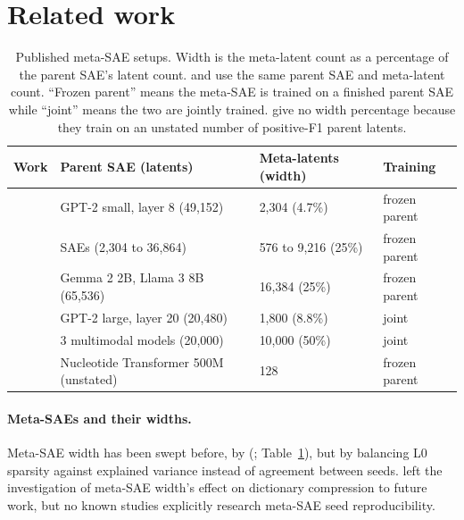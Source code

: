 \section{Related work}

\begin{table}[t]
  \caption{Published meta-SAE setups. Width is the meta-latent count as a percentage of the parent SAE's latent count. \citet{leask2025canonical} and \citet{bussmann2024metasae} use the same parent SAE and meta-latent count. ``Frozen parent'' means the meta-SAE is trained on a finished parent SAE while ``joint'' means the two are jointly trained. \citet{maiwald2025decodeglm} give no width percentage because they train on an unstated number of positive-F1 parent latents.}
  \label{tab:published}
  \centering\small
  \begin{tabular}{@{}llll@{}}
    \toprule
    Work & Parent SAE (latents) & Meta-latents (width) & Training \\
    \midrule
    \citet{bussmann2024metasae} & GPT-2 small, layer 8 (49,152) & 2,304 (4.7\%) & frozen parent \\
    \citet{bussmann2025matryoshka} & SAEs (2,304 to 36,864) & 576 to 9,216 (25\%) & frozen parent \\
    \citet{korznikov2025ortsae} & Gemma 2 2B, Llama 3 8B (65,536) & 16,384 (25\%) & frozen parent \\
    \citet{levinson2026metasaes} & GPT-2 large, layer 20 (20,480) & 1,800 (8.8\%) & joint \\
    \citet{zhao2026saepp} & 3 multimodal models (20,000) & 10,000 (50\%) & joint \\
    \citet{maiwald2025decodeglm} & Nucleotide Transformer 500M (unstated) & 128 & frozen parent \\
    \bottomrule
  \end{tabular}
\end{table}

\paragraph{Meta-SAEs and their widths.}
Meta-SAE width has been swept before, by \citeauthor{maiwald2025decodeglm} (\citeyear{maiwald2025decodeglm}; Table~\ref{tab:published}), but by balancing L0 sparsity against explained variance instead of agreement between seeds. \citet{levinson2026metasaes} left the investigation of meta-SAE width's effect on dictionary compression to future work, but no known studies explicitly research meta-SAE seed reproducibility.

